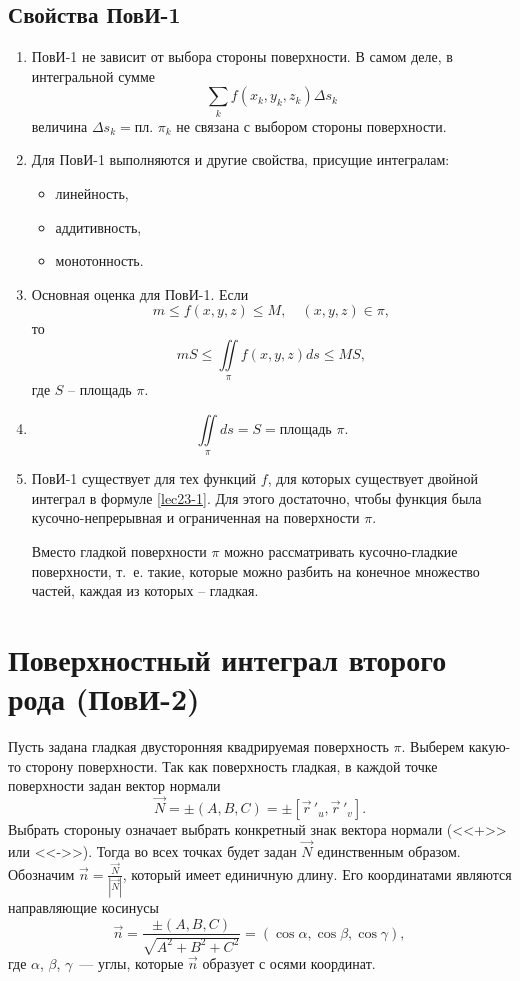 \documentclass[../../main.tex]{subfiles}
\begin{document}
	\subsection{Свойства ПовИ-1}
	\begin{enumerate}[label=\arabic*$^{\circ}$]
		\item 	ПовИ-1 не зависит от выбора стороны поверхности. В самом деле, 
		в интегральной сумме \[\sum\limits_{k} f(x_k, y_k, z_k) \Delta s_k\]
		 величина $\Delta s_k = \text{пл. } \pi_k$ не связана с выбором стороны 
		 поверхности.
		 
		\item
		 Для ПовИ-1 выполняются и другие свойства, присущие интегралам:
		 \begin{itemize}
		  \item линейность,
		  \item аддитивность,
		  \item монотонность.
		 \end{itemize}

		\item Основная оценка для ПовИ-1. Если \[m \leq f(x, y, z) \leq M, \quad (x, 
		y, z) \in \pi,\]
		  то \[mS \leq \iint \limits_\pi f(x, y, z) ds \leq MS,\] где $S$ \---
		   площадь $\pi$.
		\item \[\iint \limits_\pi ds  = S = \text{площадь }\pi.\]
		\item ПовИ-1 существует для тех функций $f$, для которых существует двойной
		 интеграл в формуле \eqref{lec23-1}. Для этого достаточно, чтобы функция была
		  кусочно-непрерывная и ограниченная на поверхности $\pi$.
		
		Вместо гладкой поверхности $\pi$ можно рассматривать кусочно-гладкие
		 поверхности, т.~е. такие, которые можно разбить на конечное множество
		  частей, каждая из которых \--- гладкая.
		\end{enumerate}
		
		\section{Поверхностный интеграл второго рода (ПовИ-2)}
		Пусть задана гладкая двусторонняя квадрируемая поверхность $\pi$. Выберем
		 какую-то сторону поверхности. Так как поверхность гладкая, в каждой точке
		  поверхности задан вектор нормали \[\vec{N} = \pm (A, B,C) = \pm
		   [\vec r\,'_u, \vec r\,'_v].\] Выбрать стороныу означает выбрать конкретный
		    знак вектора нормали (<<+>> или <<->>). 
		    Тогда во всех точках будет задан $\vec{N}$
		     единственным образом. Обозначим $\vec{n} =
		      \frac{\vec{N}}{|\vec{N}|}$, который имеет
		       единичную длину. Его координатами являются
		       направляющие косинусы
		\[\vec{n} = \frac{\pm(A,B,C)}{\sqrt{A^2 +B^2 + C^2}} = 
		(\cos \alpha, \cos \beta, \cos \gamma),\]
		где $\alpha$, $\beta$, $\gamma$~--- углы, которые $\vec n$ образует с осями 
		координат.
\end{document}
